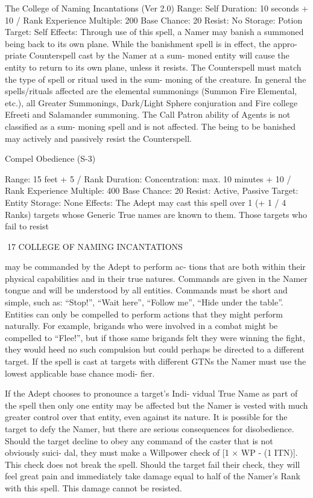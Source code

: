 \begin{Chapter}{The College of Naming Incantations (Ver 2.0)}
Range: Self 
Duration: 10 seconds + 10 / Rank 
Experience Multiple: 200 
Base Chance: 20%
Resist: No 
Storage: Potion 
Target: Self 
Effects:  Through  use  of  this  spell,  a  Namer  may 
banish  a  summoned  being  back  to  its  own  plane. 
While  the  banishment  spell  is in  effect,  the  appro-
priate  Counterspell  cast  by  the  Namer  at  a  sum-
moned  entity  will  cause  the  entity  to  return  to  its 
own plane, unless it resists. The Counterspell must 
match  the  type  of  spell  or  ritual  used  in  the  sum-
moning of the creature. In general the spells/rituals 
affected  are  the  elemental  summonings  (Summon 
Fire  Elemental,  etc.),  all  Greater  Summonings, 
Dark/Light  Sphere  conjuration  and  Fire  college 
Efreeti  and  Salamander  summoning.  The  Call 
Patron ability of Agents is not classified as a sum-
moning  spell  and  is  not  affected.  The  being  to  be 
banished  may  actively  and  passively  resist  the 
Counterspell. 

Compel Obedience (S-3) 

Range: 15 feet + 5 / Rank 
Duration:  Concentration:  max.  10  minutes  +  10  / 
Rank 
Experience Multiple: 400 
Base Chance: 20%
Resist: Active, Passive 
Target: Entity 
Storage: None 
Effects: The Adept may cast this spell over 1 (+ 1 / 
4  Ranks)  targets  whose  Generic  True  names  are 
known  to  them.  Those  targets  who  fail  to  resist 

17 COLLEGE OF NAMING INCANTATIONS 

may  be  commanded  by  the  Adept  to  perform  ac-
tions that are both within their physical capabilities 
and  in  their  true  natures.  Commands  are  given  in 
the  Namer  tongue  and  will  be  understood  by  all 
entities. Commands must be short and simple, such 
as:  “Stop!”,  “Wait  here”,  “Follow  me”,  “Hide 
under the table”. Entities can only be compelled to 
perform actions that  they  might  perform naturally. 
For  example,  brigands  who  were  involved  in  a 
combat might be compelled to “Flee!”, but if those 
same  brigands  felt  they  were  winning  the  fight, 
they  would  heed  no  such  compulsion  but  could 
perhaps be directed to a different target. If the spell 
is  cast  at  targets  with  different  GTNs  the  Namer 
must  use  the  lowest  applicable  base  chance  modi-
fier. 

If  the  Adept  chooses  to  pronounce  a  target’s  Indi-
vidual True Name as part of the spell then only one 
entity may be affected but the Namer is vested with 
much greater control over that entity, even against 
its  nature.  It  is  possible  for  the  target  to  defy  the 
Namer,  but  there  are  serious  consequences  for 
disobedience. Should the target decline to obey any 
command  of the  caster  that  is  not  obviously  suici-
dal, they must make a Willpower check of [1 × WP 
- (1%
ITN)]. This check does not break the spell. Should 
the target fail their check, they will feel great pain 
and  immediately  take  damage  equal  to  half  of  the 
Namer’s Rank with this spell. This damage cannot 
be resisted. 


\end{Chapter}
